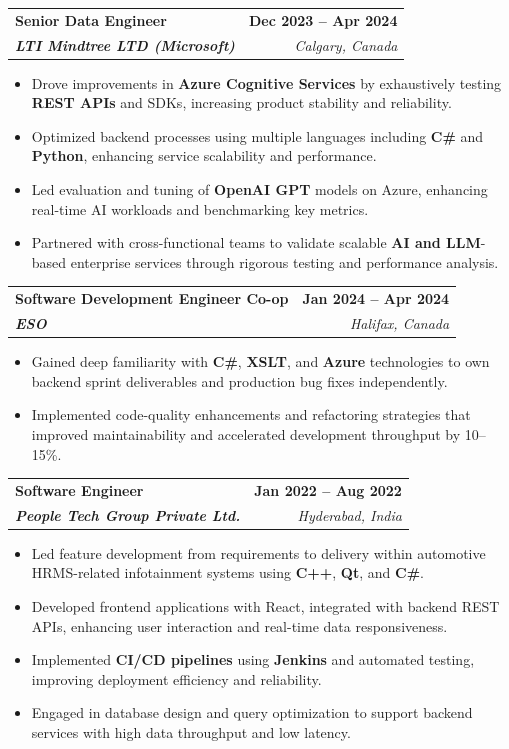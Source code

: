 \documentclass[letterpaper,11pt]{article}
\makeatletter
\newcommand{\resumeItem}[1]{
  \item\small{
    {#1 \vspace{-2pt}}
  }
}
\newcommand{\resumeSubheading}[4]{
  \vspace{-2pt}\item
    \begin{tabular*}{1.0\textwidth}[t]{l@{\extracolsep{\fill}}r}
      \textbf{#1} & \textbf{\small #2} \\
      \textit{\small#3} & \textit{\small #4} \\
    \end{tabular*}\vspace{-7pt}
}
\newcommand{\resumeItemListStart}{\begin{itemize}}
\newcommand{\resumeItemListEnd}{\end{itemize}\vspace{-5pt}}
\makeatother
\begin{document}
    \resumeSubheading
      {\textbf{Senior Data Engineer}}{\textbf{Dec 2023 -- Apr 2024}}
      {\textbf{LTI Mindtree LTD (Microsoft)}}{Calgary, Canada}
      \resumeItemListStart
        \resumeItem{Drove improvements in \textbf{Azure Cognitive Services} by exhaustively testing \textbf{REST APIs} and SDKs, increasing product stability and reliability.}
        \resumeItem{Optimized backend processes using multiple languages including \textbf{C\#} and \textbf{Python}, enhancing service scalability and performance.}
        \resumeItem{Led evaluation and tuning of \textbf{OpenAI GPT} models on Azure, enhancing real-time AI workloads and benchmarking key metrics.}
        \resumeItem{Partnered with cross-functional teams to validate scalable \textbf{AI and LLM}-based enterprise services through rigorous testing and performance analysis.}
      \resumeItemListEnd
    
    \resumeSubheading
      {\textbf{Software Development Engineer Co-op}}{\textbf{Jan 2024 -- Apr 2024}}
      {\textbf{ESO}}{Halifax, Canada}
      \resumeItemListStart
        \resumeItem{Gained deep familiarity with \textbf{C\#}, \textbf{XSLT}, and \textbf{Azure} technologies to own backend sprint deliverables and production bug fixes independently.}
        \resumeItem{Implemented code-quality enhancements and refactoring strategies that improved maintainability and accelerated development throughput by 10--15\%.}
      \resumeItemListEnd

    \resumeSubheading
      {\textbf{Software Engineer}}{\textbf{Jan 2022 -- Aug 2022}}
      {\textbf{People Tech Group Private Ltd.}}{Hyderabad, India}
      \resumeItemListStart
        \resumeItem{Led feature development from requirements to delivery within automotive HRMS-related infotainment systems using \textbf{C++}, \textbf{Qt}, and \textbf{C\#}.}
        \resumeItem{Developed frontend applications with React, integrated with backend REST APIs, enhancing user interaction and real-time data responsiveness.}
        \resumeItem{Implemented \textbf{CI/CD pipelines} using \textbf{Jenkins} and automated testing, improving deployment efficiency and reliability.}
        \resumeItem{Engaged in database design and query optimization to support backend services with high data throughput and low latency.}
      \resumeItemListEnd
\end{document}
